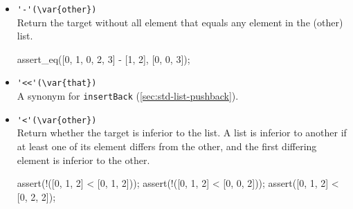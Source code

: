 \begin{itemize}
\item \lstinline|'-'(\var{other})|\\
Return the target without all element that equals any element in the
\var(other) list.

\begin{urbiscript}[firstnumber=last]
assert_eq([0, 1, 0, 2, 3] - [1, 2], [0, 0, 3]);
\end{urbiscript}

\item \lstinline|'<<'(\var{that})|\\
A synonym for \lstinline|insertBack| (\autoref{sec:std-list-pushback}).

\item \lstinline|'<'(\var{other})|\\
Return whether the target is inferior to the  list. A list is
inferior to another if at least one of its element differs from the
other, and the first differing element is inferior to the other.

\begin{urbiscript}[firstnumber=last]
assert(!([0, 1, 2] < [0, 1, 2]));
assert(!([0, 1, 2] < [0, 0, 2]));
assert([0, 1, 2] < [0, 2, 2]);
\end{urbiscript}

\end{itemize}


